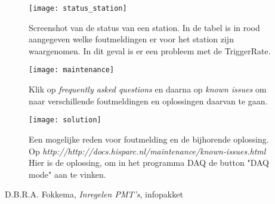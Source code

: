 \begin{figure} 
\centering 
\texttt{[image: status\_station]}
\label{fig:status_station} 
\caption{Screenshot van de status van een
station. In de tabel is in rood aangegeven welke foutmeldingen er voor het station zijn waargenomen. In dit geval is er een probleem met de TriggerRate.} 
\end{figure}

\begin{figure} 
\centering 
\texttt{[image: maintenance]}
\label{fig:maintenance} 
\caption{Klik op \emph{frequently asked questions} en daarna op \emph{known issues} om naar verschillende foutmeldingen en oplossingen daarvan te gaan.} 
\end{figure}
 
\begin{figure} 
\centering 
\texttt{[image: solution]}
\label{fig:solution} 
\caption{Een mogelijke reden voor foutmelding en de bijhorende oplossing. Op \emph{http://http://docs.hisparc.nl/maintenance/known-issues.html} Hier is de oplossing, om in het programma \hisparc DAQ de button "DAQ mode" aan te vinken.} 
\end{figure}




\begin{thebibliography}{9} 
	
	 D.B.R.A. Fokkema, \emph{Inregelen PMT's}, infopakket \hisparc 
\end{thebibliography}




